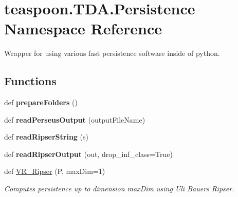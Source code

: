 \hypertarget{namespaceteaspoon_1_1_t_d_a_1_1_persistence}{}\section{teaspoon.\+T\+D\+A.\+Persistence Namespace Reference}
\label{namespaceteaspoon_1_1_t_d_a_1_1_persistence}


Wrapper for using various fast persistence software inside of python.


\subsection*{Functions}
\begin{DoxyCompactItemize}
\item
\mbox{\label{namespaceteaspoon_1_1_t_d_a_1_1_persistence_aa767596a9f61323ef4e489e42890cd45}}
def {\bfseries prepare\+Folders} ()
\item
\mbox{\label{namespaceteaspoon_1_1_t_d_a_1_1_persistence_a3d273210437e69be2df595ed1751c661}}
def {\bfseries read\+Perseus\+Output} (output\+File\+Name)
\item
\mbox{\label{namespaceteaspoon_1_1_t_d_a_1_1_persistence_a862eea03c953145bb9290c1681f1f850}}
def {\bfseries read\+Ripser\+String} (s)
\item
\mbox{\label{namespaceteaspoon_1_1_t_d_a_1_1_persistence_a18684f9ea2d52bb31094f8de25dcbc90}}
def {\bfseries read\+Ripser\+Output} (out, drop\+\_\+inf\+\_\+class=True)
\item
def \hyperlink{namespaceteaspoon_1_1_t_d_a_1_1_persistence_ae38f90d312da5c7fb8587a2f44e67b8a}{V\+R\+\_\+\+Ripser} (P, max\+Dim=1)
\begin{DoxyCompactList}\small\item\em Computes persistence up to dimension max\+Dim using Uli Bauer\textquotesingle{}s Ripser. \end{DoxyCompactList}\item
\mbox{\label{namespaceteaspoon_1_1_t_d_a_1_1_persistence_a074e092c57bca5b1652c7b2a2c41f603}}

\end{DoxyCompactItemize}
